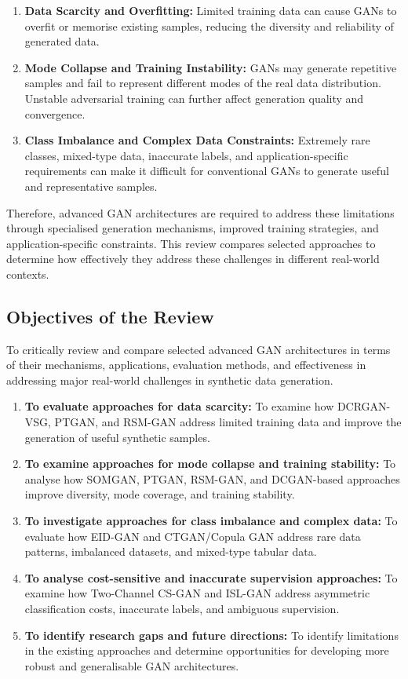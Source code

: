 \documentclass[12pt,a4paper]{article}
\begin{document}
\begin{enumerate} 
\item \textbf{Data Scarcity and Overfitting:} 
Limited training data can cause GANs to overfit or memorise existing samples, reducing the diversity and reliability of generated data. 
\item \textbf{Mode Collapse and Training Instability:} GANs may generate repetitive samples and fail to represent different modes of the real data distribution. Unstable adversarial training can further affect generation quality and convergence. 
\item \textbf{Class Imbalance and Complex Data Constraints:} Extremely rare classes, mixed-type data, inaccurate labels, and application-specific requirements can make it difficult for conventional GANs to generate useful and representative samples. 

\end{enumerate} Therefore, advanced GAN architectures are required to address these limitations through specialised generation mechanisms, improved training strategies, and application-specific constraints. This review compares selected approaches to determine how effectively they address these challenges in different real-world contexts.


\subsection{Objectives of the Review}

To critically review and compare selected advanced GAN architectures in terms of their mechanisms, applications, evaluation methods, and effectiveness in addressing major real-world challenges in synthetic data generation.

\vspace{0.5cm}


\begin{enumerate} 
\item \textbf{To evaluate approaches for data scarcity:} To examine how DCRGAN-VSG, PTGAN, and RSM-GAN address limited training data and improve the generation of useful synthetic samples. 
\item \textbf{To examine approaches for mode collapse and training stability:} To analyse how SOMGAN, PTGAN, RSM-GAN, and DCGAN-based approaches improve diversity, mode coverage, and training stability. 
\item \textbf{To investigate approaches for class imbalance and complex data:} To evaluate how EID-GAN and CTGAN/Copula GAN address rare data patterns, imbalanced datasets, and mixed-type tabular data. 
\item \textbf{To analyse cost-sensitive and inaccurate supervision approaches:} To examine how Two-Channel CS-GAN and ISL-GAN address asymmetric classification costs, inaccurate labels, and ambiguous supervision. 
\item \textbf{To identify research gaps and future directions:} To identify limitations in the existing approaches and determine opportunities for developing more robust and generalisable GAN architectures. 
\end{enumerate}
\end{document}
